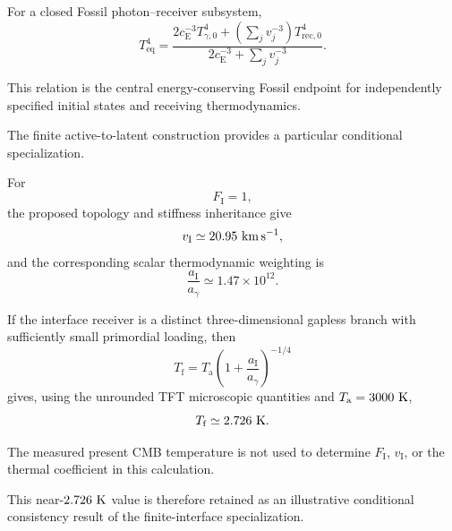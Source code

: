 For a closed Fossil photon--receiver subsystem,
\begin{equation}
    \boxed{
    T_{\mathrm{eq}}^4
    =
    \frac{
        2c_{\mathrm E}^{-3}
        T_{\gamma,0}^4
        +
        \left(
            \displaystyle\sum_j
            v_j^{-3}
        \right)
        T_{\mathrm{rec},0}^4
    }{
        2c_{\mathrm E}^{-3}
        +
        \displaystyle\sum_j
        v_j^{-3}
    }.
    }
    \label{eq:AT_summary_fossil_temperature}
\end{equation}

This relation is the central energy-conserving Fossil endpoint for
independently specified initial states and receiving thermodynamics.

The finite active-to-latent construction provides a particular conditional
specialization.

For
\begin{equation}
    F_{\mathrm I}=1,
\end{equation}
the proposed topology and stiffness inheritance give
\begin{equation}
    v_{\mathrm I}
    \simeq
    20.95~{\rm km\,s^{-1}},
\end{equation}
and the corresponding scalar thermodynamic weighting is
\begin{equation}
    \frac{
        a_{\mathrm I}
    }{
        a_\gamma
    }
    \simeq
    1.47\times10^{12}.
\end{equation}

If the interface receiver is a distinct three-dimensional gapless branch with
sufficiently small primordial loading, then
\begin{equation}
    T_{\mathrm f}
    =
    T_{\mathrm a}
    \left(
        1+
        \frac{
            a_{\mathrm I}
        }{
            a_\gamma
        }
    \right)^{-1/4}
\end{equation}
gives, using the unrounded TFT microscopic quantities and
\(T_{\mathrm a}=3000~{\rm K}\),
\begin{equation}
    T_{\mathrm f}
    \simeq
    2.726~{\rm K}.
\end{equation}

The measured present CMB temperature is not used to determine
\(F_{\mathrm I}\),
\(v_{\mathrm I}\),
or the thermal coefficient in this calculation.

This near-\(2.726~{\rm K}\) value is therefore retained as an illustrative
conditional consistency result of the finite-interface specialization.

